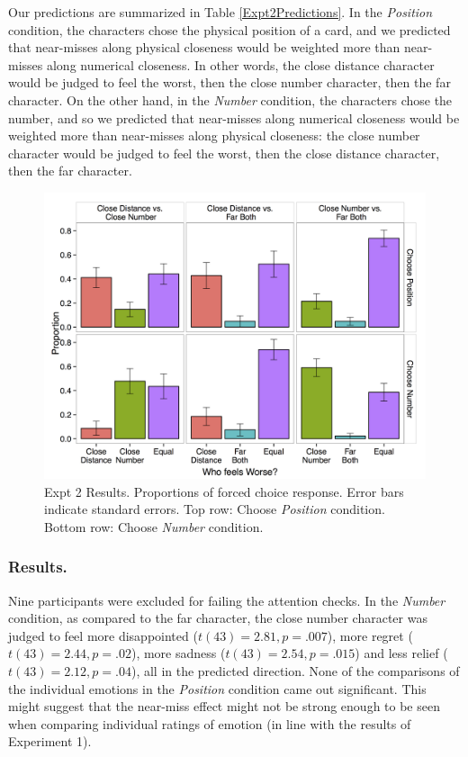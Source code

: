 \documentclass[10pt,letterpaper]{article}
\begin{document}
	Our predictions are summarized in Table \ref{Expt2Predictions}. In the \textit{Position} condition, the characters chose the physical position of a card, and we predicted that near-misses along physical closeness would be weighted more than near-misses along numerical closeness. In other words, the close distance character would be judged to feel the worst, then the close number character, then the far character. On the other hand, in the \textit{Number} condition, the characters chose the number, and so we predicted that near-misses along numerical closeness would be weighted more than near-misses along physical closeness: the close number character would be judged to feel the worst, then the close distance character, then the far character.



\begin{figure}[htb!]
\includegraphics[width=\columnwidth]{images/cardCombined_forcedWorse.png}
\caption{ Expt 2 Results. Proportions of forced choice response. Error bars indicate standard errors. Top row: Choose \textit{Position} condition. Bottom row: Choose \textit{Number} condition.}
\label{Expt2ResultFig}
\end{figure}

\subsubsection{Results.} Nine participants were excluded for failing the attention checks. In the \textit{Number} condition, as compared to the far character, the close number character was judged to feel more disappointed ($t(43)=2.81, p=.007$), more regret ($t(43)=2.44, p=.02$), more sadness ($t(43)=2.54, p=.015$) and less relief ($t(43)=2.12, p=.04$), all in the predicted direction. None of the comparisons of the individual emotions in the \textit{Position} condition came out significant. This might suggest that the near-miss effect might not be strong enough to be seen when comparing individual ratings of emotion (in line with the results of Experiment 1).
\end{document}
